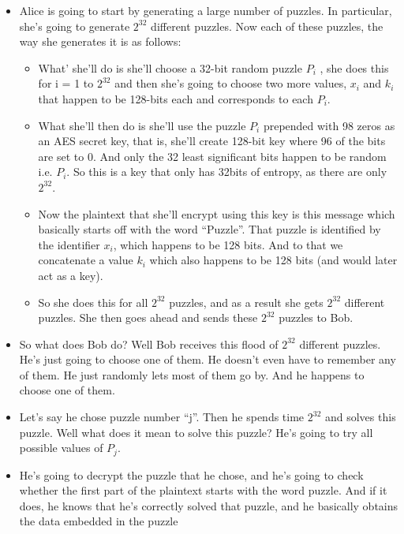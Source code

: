 \documentclass[11pt]{article}
\begin{document}
\begin{itemize}
\item
  Alice is going to start by generating a large number of puzzles. In
  particular, she's going to generate \(2^{32}\) different puzzles. Now
  each of these puzzles, the way she generates it is as follows:

  \begin{itemize}
  \item
    What' she'll do is she'll choose a 32-bit random puzzle \(P_{i}\) ,
    she does this for i = 1 to \(2^{32}\) and then she's going to choose
    two more values, \(x_{i}\) and \(k_{i}\) that happen to be 128-bits
    each and corresponds to each \(P_{i}\). 
  \item
    What she'll then do is she'll use the puzzle \(P_{i}\) prepended
    with 98 zeros as an AES secret key, that is, she'll create 128-bit
    key where 96 of the bits are set to 0. And only the 32 least
    significant bits happen to be random i.e. \(P_{i}\). So this is a
    key that only has 32bits of entropy, as there are only \(2^{32}\). 
  \item
    Now the plaintext that she'll encrypt using this key is this message
    which basically starts off with the word ``Puzzle''. That puzzle is
    identified by the identifier \(x_{i}\), which happens to be 128
    bits. And to that we concatenate a value \(k_{i}\) which also
    happens to be 128 bits (and would later act as a key). 
  \item
    So she does this for all \(2^{32}\) puzzles, and as a result she
    gets \(2^{32}\) different puzzles. She then goes ahead and sends
    these \(2^{32}\) puzzles to Bob. 
  \end{itemize}
\item
  So what does Bob do? Well Bob receives this flood of \(2^{32}\)
  different puzzles. He's just going to choose one of them. He doesn't
  even have to remember any of them. He just randomly lets most of them
  go by. And he happens to choose one of them.
\item
  Let's say he chose puzzle number ``j''. Then he spends time \(2^{32}\)
  and solves this puzzle. Well what does it mean to solve this puzzle?
  He's going to try all possible values of \(P_{j}\). 
\item
  He's going to decrypt the puzzle that he chose, and he's going to
  check whether the first part of the plaintext starts with the word
  puzzle. And if it does, he knows that he's correctly solved that
  puzzle, and he basically obtains the data embedded in the puzzle

\end{itemize}
\end{document}
